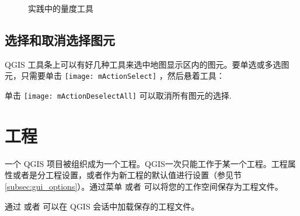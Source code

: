 \begin{figure}[ht]
\centering
     \hspace{0.33cm}
     \hspace{0.33cm}
   \caption{实践中的量度工具 \nixcaption} \label{fig:measure}
\end{figure}

\subsection{选择和取消选择图元}\label{sec:selection}

QGIS 工具条上可以有好几种工具来选中地图显示区内的图元。要单选或多选图元，只需要单击 \texttt{[image: mActionSelect]} ，然后悬着工具：

\begin{description}
\item {}
\item {}
\item {}
\item {}
\item {}
\end{description} 

单击 \texttt{[image: mActionDeselectAll]} 可以取消所有图元的选择.

\section{工程}\label{sec:projects}

一个 QGIS 项目被组织成为一个工程。QGIS一次只能工作于某一个工程。工程属性或者是分工程设置，或者作为新工程的默认值进行设置（参见节 \ref{subsec:gui_options}）。通过菜单  \arrow {} 或者  \arrow {} 可以将您的工作空间保存为工程文件。

通过  \arrow {} 或者   \arrow {} 可以在 QGIS 会话中加载保存的工程文件。

